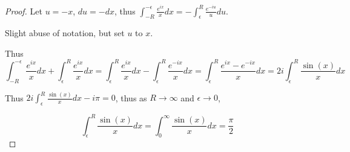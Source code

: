 \documentclass{article}
\begin{document}
\begin{proof}
    Let $u = -x$, $du = -dx$, thus $\int_{-R}^{-\epsilon} \frac{e^{ix}}{x} dx = -\int_{\epsilon}^{R} \frac{e^{-iu}}{u} du$.
    
    Slight abuse of notation, but set $u$ to $x$.   
    
    Thus \[
        \int_{-R}^{-\epsilon} \frac{e^{ix}}{x} dx + \int_{\epsilon}^{R} \frac{e^{ix}}{x} dx = \int_{\epsilon}^{R} \frac{e^{ix}}{x} dx -\int_{\epsilon}^{R} \frac{e^{-ix}}{x} dx = \int_{\epsilon}^{R} \frac{e^{ix} - e^{-ix}}{x} dx = 2 i \int_{\epsilon}^{R} \frac{\sin(x)}{x} dx
    \]

    Thus $2 i \int_{\epsilon}^{R} \frac{\sin(x)}{x} dx - i \pi = 0$, thus as $R \to \infty$ and $\epsilon \to 0$,
    
    \[\int_{\epsilon}^{R} \frac{\sin(x)}{x} dx  = \int_{0}^{\infty} \frac{\sin(x)}{x} dx= \frac{\pi}{2}\]
\end{proof}

\bigskip
\end{document}
